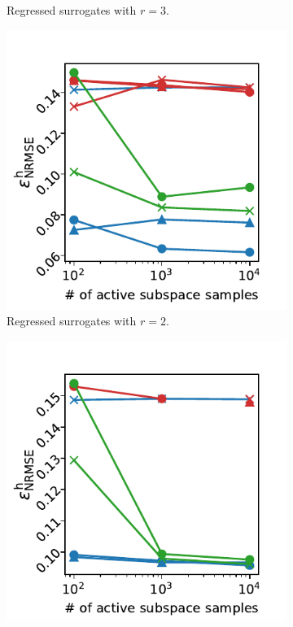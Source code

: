 \documentclass[
  a4paper,  %
  twoside,  %
  bibliography=totoc,
  headsepline,
  cleardoublepage=empty,
  parskip=half,
  draft=false
]{scrbook}
\begin{document}
\begin{mdframed}[style=style]
\begin{figure}[H]
\begin{subfigure}{.5\textwidth}
	\caption{Regressed surrogates with $r=3$.}
	\label{fig:ishigami_as_3}
\end{subfigure}
\begin{subfigure}{.5\textwidth}
  \centering
   \includegraphics[width=\linewidth]{graphics/ishigami_as_2}
	\caption{Regressed surrogates with $r=2$.}
	\label{fig:ishigami_as_2}
\end{subfigure}
\begin{subfigure}{.5\textwidth}
  \centering
   \includegraphics[width=\linewidth]{graphics/ishigami_as_1}

\end{subfigure}
\end{figure}
\end{mdframed}
\end{document}

